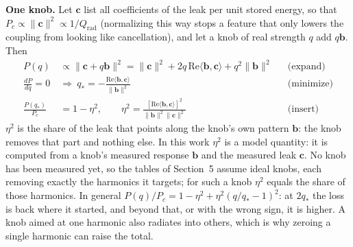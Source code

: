 \documentclass[11pt]{article}
\begin{document}
\textbf{One knob.} Let $\mathbf c$ list all coefficients of the leak per unit stored energy, so that $P_c\propto\|\mathbf c\|^2\propto1/Q_\mathrm{rad}$ (normalizing this way stops a feature that only lowers the coupling from looking like cancellation), and let a knob of real strength $q$ add $q\mathbf b$. Then
\begin{align}
P(q)&\propto\|\mathbf c+q\mathbf b\|^2=\|\mathbf c\|^2+2q\,\mathrm{Re}\langle\mathbf b,\mathbf c\rangle+q^2\|\mathbf b\|^2 && \text{(expand)}\\
\frac{dP}{dq}=0\ &\Rightarrow\ q_*=-\frac{\mathrm{Re}\langle\mathbf b,\mathbf c\rangle}{\|\mathbf b\|^2} && \text{(minimize)}\\
\frac{P(q_*)}{P_c}&=1-\eta^2,\qquad \eta^2=\frac{[\mathrm{Re}\langle\mathbf b,\mathbf c\rangle]^2}{\|\mathbf b\|^2\|\mathbf c\|^2}&& \text{(insert)}
\end{align}
$\eta^2$ is the share of the leak that points along the knob's own pattern $\mathbf b$: the knob removes that part and nothing else. In this work $\eta^2$ is a model quantity: it is computed from a knob's measured response $\mathbf b$ and the measured leak $\mathbf c$. No knob has been measured yet, so the tables of Section~5 assume ideal knobs, each removing exactly the harmonics it targets; for such a knob $\eta^2$ equals the share of those harmonics. In general $P(q)/P_c=1-\eta^2+\eta^2(q/q_*-1)^2$: at $2q_*$ the loss is back where it started, and beyond that, or with the wrong sign, it is higher. A knob aimed at one harmonic also radiates into others, which is why zeroing a single harmonic can raise the total.
\end{document}
